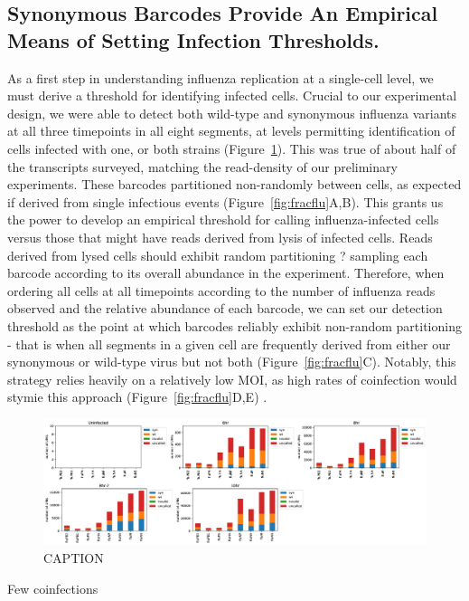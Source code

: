 \documentclass[9pt,lineno]{elife}
\begin{document}
\subsection{Synonymous Barcodes Provide An Empirical Means of Setting Infection Thresholds.}
As a first step in understanding influenza replication at a single-cell level, we must derive a threshold for identifying infected cells. Crucial to our experimental design, we were able to detect both wild-type and synonymous influenza variants at all three timepoints in all eight segments, at levels permitting identification of cells infected with one, or both strains (Figure~\ref{fig:synbarcodes}). This was true of about half of the transcripts surveyed, matching the read-density of our preliminary experiments. These barcodes partitioned non-randomly between cells, as expected if derived from single infectious events (Figure~\ref{fig:fracflu}A,B). This grants us the power to develop an empirical threshold for calling influenza-infected cells versus those that might have reads derived from lysis of infected cells. Reads derived from lysed cells should exhibit random partitioning ? sampling each barcode according to its overall abundance in the experiment. Therefore, when ordering all cells at all timepoints according to the number of influenza reads observed and the relative abundance of each barcode, we can set our detection threshold as the point at which barcodes reliably exhibit non-random partitioning - that is when all segments in a given cell are frequently derived from either our synonymous or wild-type virus but not both (Figure~\ref{fig:fracflu}C). Notably, this strategy relies heavily on a relatively low MOI, as high rates of coinfection would stymie this approach (Figure~\ref{fig:fracflu}D,E) . 

\begin{figure}
\includegraphics[width=\linewidth]{figures/synbarcodes_umistats.jpg}
\caption{
CAPTION}
\label{fig:synbarcodes}
\end{figure}


Few coinfections
\end{document}

